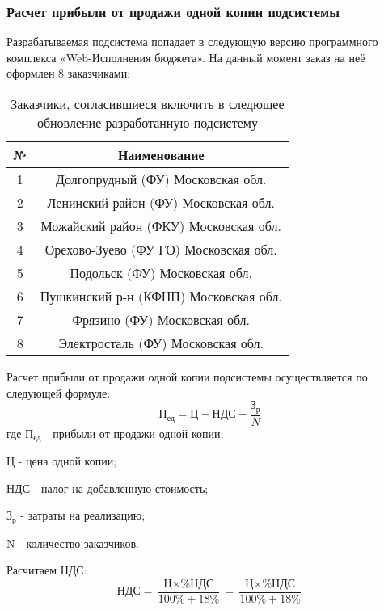 \documentclass[a4paper]{extarticle}
\begin{document}
\subsubsection{Расчет прибыли от продажи одной копии подсистемы}
Разрабатываемая подсистема попадает в следующую версию программного комплекса «Web-Исполнения бюджета». На данный момент заказ на неё оформлен 8 заказчиками:\par
\begin{table}[H]
\caption{Заказчики, согласившиеся включить в следющее обновление разработанную подсистему}
\centering
  \begin{tabular}{|c|c|}
  \hline
  № & Наименование \\\hline
  1 & Долгопрудный (ФУ) Московская обл. \\\hline
  2 & Ленинский район (ФУ) Московская обл. \\\hline
  3 & Можайский район (ФКУ) Московская обл. \\\hline
  4 & Орехово-Зуево (ФУ ГО) Московская обл. \\\hline
  5 & Подольск (ФУ) Московская обл. \\\hline
  6 & Пушкинский р-н (КФНП) Московская обл. \\\hline
  7 & Фрязино (ФУ) Московская обл. \\\hline
  8 & Электросталь (ФУ) Московская обл. \\\hline
  \end{tabular}
\end{table}\par

Расчет прибыли от продажи одной копии подсистемы осуществляется по следующей формуле:
\begin{equation}
\label{form13}
	\text{П}_\text{ед}=\text{Ц}-\text{НДС}-\frac{\text{З}_\text{р}}{N}
\end{equation}
где $\text{П}_\text{ед}$ - прибыли от продажи одной копии;\par
$\text{Ц}$ - цена одной копии;\par
$\text{НДС}$ - налог на добавленную стоимость;\par
$\text{З}_\text{р}$ - затраты на реализацию;\par
N - количество заказчиков.\par
Расчитаем НДС:
\begin{equation}
\label{form14}
	\text{НДС}=\frac{\text{Ц}\times \text{\%НДС}}{100\%+18\%}=\frac{\text{Ц}\times \text{\%НДС}}{100\%+18\%}
\end{equation}
\end{document}
